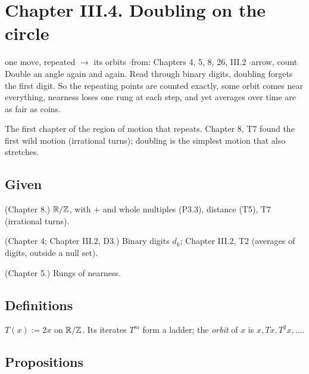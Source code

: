 \section*{Chapter III.4. Doubling on the circle}
\begin{center}
{\normalsize one move, repeated $\to$ its orbits \quad$\cdot$\quad from: Chapters 4, 5, 8, 26, III.2 \quad$\cdot$\quad arrow, count}\\[4pt]
{\small Double an angle again and again. Read through binary digits, doubling forgets the first digit. So the repeating points are counted exactly, some orbit comes near everything, nearness loses one rung at each step, and yet averages over time are as fair as coins.}
\end{center}

The first chapter of the region of motion that repeats. Chapter 8, T7 found the first wild motion (irrational turns); doubling is the simplest motion that also stretches.

\subsection*{Given}

\begin{lines}
\item[\lab{G1}] (Chapter 8.) $\mathbb{R}/\mathbb{Z}$, with $+$ and whole multiples (P3.3), distance (T5), T7 (irrational turns).
\item[\lab{G2}] (Chapter 4; Chapter III.2, D3.) Binary digits $d_k$; Chapter III.2, T2 (averages of digits, outside a null set).
\item[\lab{G3}] (Chapter 5.) Rungs of nearness.
\end{lines}

\subsection*{Definitions}

\begin{lines}
\item[\lab{D1}] $T(x) := 2x$ on $\mathbb{R}/\mathbb{Z}$. Its iterates $T^m$ form a ladder; the \emph{orbit} of $x$ is $x, Tx, T^2x, \dots$.
\end{lines}

\subsection*{Propositions}

